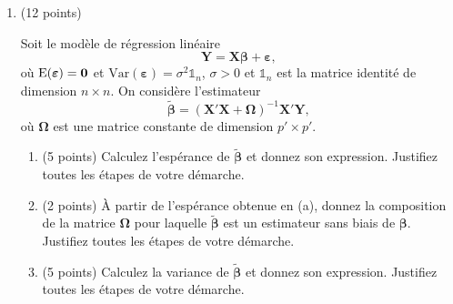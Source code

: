 \documentclass[11pt]{article}
\begin{document}
{\begin{enumerate}

\newpage


\item (12 points)

Soit le mod\`ele de r\'egression lin\'eaire 
$$\boldsymbol{Y} = \boldsymbol{X} \boldsymbol{\beta} + {\boldsymbol{\varepsilon}},$$
o\`u $\mathrm{E}({\boldsymbol{\varepsilon}}) = {\bf 0}$ et $\mathrm{Var}({\boldsymbol{\varepsilon}})=\sigma^2 \mathbb{1}_n $, $\sigma>0$ et $\mathbb{1}_n$ est la matrice identit\'e de dimension $n\times n$. On considère l'estimateur  $$\widetilde{\boldsymbol{\beta}} = (\boldsymbol{X}'\boldsymbol{X} + \boldsymbol{\Omega} )^{-1} \boldsymbol{X}'\boldsymbol{Y},$$ 
où   $\boldsymbol{\Omega}$ est une matrice constante de dimension $p' \times p'$.

\begin{enumerate}
	\item (5 points) Calculez l'espérance de $\widetilde{\boldsymbol{\beta}}$ et donnez son expression. Justifiez toutes les étapes de votre démarche.
 \vspace{2in}
	\item (2 points) À partir de l'espérance obtenue en (a), donnez la composition de la matrice $\boldsymbol{\Omega}$ pour laquelle  $\widetilde{\boldsymbol{\beta}}$ est un estimateur sans biais de  ${\boldsymbol{\beta}}$. Justifiez toutes les étapes de votre démarche.
 \vspace{2in}
    \item (5 points) Calculez la variance de $\widetilde{\boldsymbol{\beta}}$ et donnez son expression. Justifiez toutes les étapes de votre démarche.
\end{enumerate}

%

\end{enumerate}}
\end{document}

